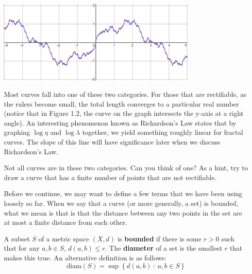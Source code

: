   \begin{center}
    \includegraphics[width=0.75\textwidth]{Images/Chap1/1.1.2.png}
  
  \end{center}

Most curves fall into one of these two categories. For those that are rectifiable, as the rulers become small, the total length converges to a particular real number (notice that in Figure 1.2, the curve on the graph intersects the y-axis at a right angle). An interesting phenomenon known as Richardson's Law states that by graphing $\log\eta$ and $\log\lambda$ together, we yield something roughly linear for fractal curves. The slope of this line will have significance later when we discuss Richardson's Law.\\

\begin{exercise}
    Not all curves are in these two categories. Can you think of one? As a hint, try to draw a curve that has a finite number of points that are not rectifiable. 
\end{exercise}

Before we continue, we may want to define a few terms that we have been using loosely so far. When we say that a curve (or more generally, a set) is bounded, what we mean is that is that the distance between any two points in the set are at most a finite distance from each other.\\ 

\begin{definition}
A subset $S$ of a metric space $(X,d)$ is \textbf{bounded} if there is some $r>0$ such that for any $a,b\in S$, $d(a,b)\leq r$. The \textbf{diameter} of a set is the smallest $r$ that makes this true. An alternative definition is as follows:
\[\text{diam}(S) = \sup\left\{ 
d(a,b) \ : \ a,b\in S \right\}\]
\end{definition}

